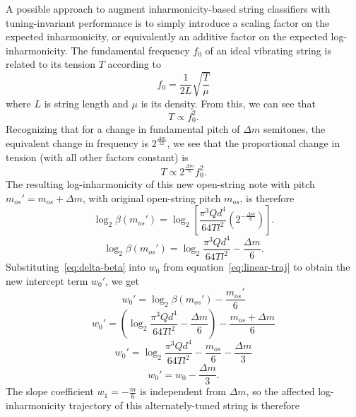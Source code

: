 \documentclass[12pt]{cmuthesis}
\begin{document}
A possible approach to augment inharmonicity-based string classifiers with tuning-invariant performance is to simply introduce a scaling factor on the expected inharmonicity, or equivalently an additive factor on the expected log-inharmonicity. The fundamental frequency $f_0$ of an ideal vibrating string is related to its tension $T$ according to
\begin{equation}
f_0 = \frac{1}{2L}\sqrt{\frac{T}{\mu}}
\end{equation}
where $L$ is string length and $\mu$ is its density. From this, we can see that
\begin{equation}
T \propto f_0^{2}.
\end{equation}
Recognizing that for a change in fundamental pitch of $\Delta m$ semitones, the equivalent change in frequency is $2^{\frac{\Delta m}{12}}$, we see that the proportional change in tension (with all other factors constant) is
\begin{equation}
T \propto 2^{\frac{\Delta m}{6}}f_0^2.
\end{equation}
The resulting log-inharmonicity of this new open-string note with pitch $m_{os}' = m_{os}+\Delta m$, with original open-string pitch $m_{os}$, is therefore
\begin{equation}
\log_2\beta(m_{os}') = \log_2[ \frac{\pi^3 Q d^4}{64 T l^2}(2^{-\frac{\Delta m}{6}})].
\end{equation}
\begin{equation}
\label{eq:delta-beta}
\log_2\beta(m_{os}') = \log_2\frac{\pi^3 Q d^4}{64 T l^2} - \frac{\Delta m}{6}.
\end{equation}
Substituting~\eqref{eq:delta-beta} into $w_0$ from equation~\eqref{eq:linear-traj} to obtain the new intercept term $w_0'$, we get
\begin{equation}
w_{0}' = \log_2{\beta}(m_{os}') - \frac{m_{os}'}{6}
\end{equation}
\begin{equation}
w_{0}' = (\log_2\frac{\pi^3 Q d^4}{64 T l^2} - \frac{\Delta m}{6}) - \frac{m_{os}+\Delta m}{6}
\end{equation}
\begin{equation}
\label{eq:3.17}
w_{0}' = \log_2\frac{\pi^3 Q d^4}{64 T l^2} - \frac{m_{os}}{6} - \frac{\Delta m}{3}
\end{equation}
\begin{equation}
\label{eq:3.18}
w_{0}' = w_0 - \frac{\Delta m}{3}.
\end{equation}
The slope coefficient $w_1 = -\frac{m}{6}$ is independent from ${\Delta m}$, so the affected log-inharmonicity trajectory of this alternately-tuned string is therefore
\end{document}
